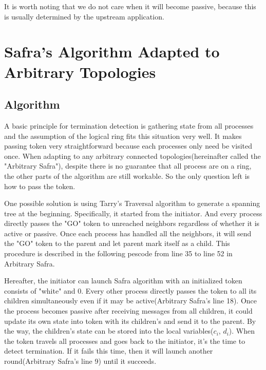 \documentclass{article}
\begin{document}
It is worth noting that we do not care when it will become passive, because this is usually determined by the upstream application.

\section{Safra's Algorithm Adapted to Arbitrary Topologies}
\subsection{Algorithm}
A basic principle for termination detection is gathering state from all processes and the assumption of the logical ring fits this situation very well. It makes passing token very straightforward because each processes only need be visited once. When adapting to any arbitrary connected topologies(hereinafter called the "Arbitrary Safra"), despite there is no guarantee that all process are on a ring, the other parts of the algorithm are still workable. So the only question left is how to pass the token.

One possible solution is using Tarry's Traversal algorithm\cite[][]{tarry} to generate a spanning tree at the beginning. Specifically, it started from the initiator. And every process directly passes the "GO" token to unreached neighbors regardless of whether it is active or passive. Once each process has handled all the neighbors, it will send the "GO" token to the parent and let parent mark itself as a child. This procedure is described in the following pescode from line 35 to line 52 in Arbitrary Safra.

Hereafter, the initiator can launch Safra algorithm with an initialized token consists of "white" and 0. Every other process directly passes the token to all its children simultaneously even if it may be active(Arbitrary Safra's line 18).
Once the process becomes passive after receiving messages from all children, it could update its own state into token with its children's and send it to the parent. By the way, the children's state can be stored into the local variables($c_i$, $d_i$).
When the token travels all processes and goes back to the initiator, it's the time to detect termination. If it fails this time, then it will launch another round(Arbitrary Safra's line 9) until it succeeds.
\end{document}

